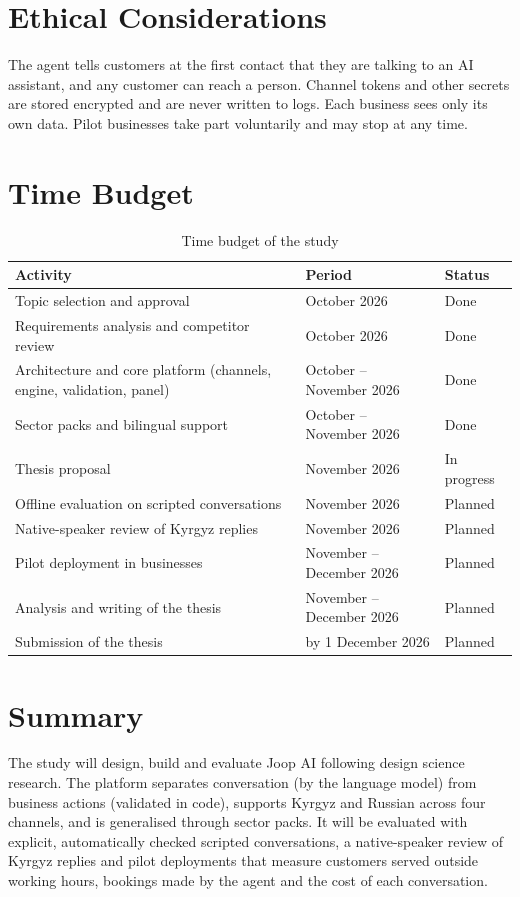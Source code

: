 \section{Ethical Considerations}

The agent tells customers at the first contact that they are talking to an AI assistant, and any customer can reach a
person. Channel tokens and other secrets are stored encrypted and are never written to logs. Each business sees only its
own data. Pilot businesses take part voluntarily and may stop at any time.

\section{Time Budget}

\begin{table}[H]
\centering
\begin{tabular}{|p{6.2cm}|p{4.2cm}|p{3cm}|}
\hline
\textbf{Activity} & \textbf{Period} & \textbf{Status} \\
\hline
Topic selection and approval & October 2026 & Done \\
\hline
Requirements analysis and competitor review & October 2026 & Done \\
\hline
Architecture and core platform (channels, engine, validation, panel) & October -- November 2026 & Done \\
\hline
Sector packs and bilingual support & October -- November 2026 & Done \\
\hline
Thesis proposal & November 2026 & In progress \\
\hline
Offline evaluation on scripted conversations & November 2026 & Planned \\
\hline
Native-speaker review of Kyrgyz replies & November 2026 & Planned \\
\hline
Pilot deployment in businesses & November -- December 2026 & Planned \\
\hline
Analysis and writing of the thesis & November -- December 2026 & Planned \\
\hline
Submission of the thesis & by 1 December 2026 & Planned \\
\hline
\end{tabular}
\caption{Time budget of the study}
\label{tab:timebudget}
\end{table}

\section{Summary}

The study will design, build and evaluate Joop AI following design science research. The platform separates
conversation (by the language model) from business actions (validated in code), supports Kyrgyz and Russian across four
channels, and is generalised through sector packs. It will be evaluated with explicit, automatically checked scripted
conversations, a native-speaker review of Kyrgyz replies and pilot deployments that measure customers served outside
working hours, bookings made by the agent and the cost of each conversation.
